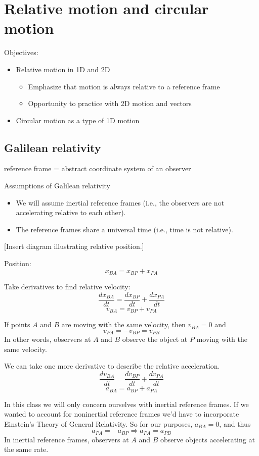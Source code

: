 \section{Relative motion and circular motion}
Objectives:
\begin{itemize}
\item Relative motion in 1D and 2D
  \begin{itemize}
  \item Emphasize that motion is always relative to a reference frame
  \item Opportunity to practice with 2D motion and vectors
  \end{itemize} 
\item Circular motion as a type of 1D motion
\end{itemize}
\hrulefill

\subsection{Galilean relativity}
reference frame = abstract coordinate system of an observer

Assumptions of Galilean relativity
\begin{itemize}
\item We will assume inertial reference frames (i.e., the observers are not accelerating relative to each other).
\item The reference frames share a universal time (i.e., time is not relative).
\end{itemize}
  
[Insert diagram illustrating relative position.]
\vspace{5cm}

Position:
$$\boxed{x_{BA}=x_{BP}+x_{PA}}$$

Take derivatives to find relative velocity:
$$\frac{dx_{BA}}{dt}=\frac{dx_{BP}}{dt}+\frac{dx_{PA}}{dt}$$
$$\boxed{v_{BA}=v_{BP}+v_{PA}}$$

If points $A$ and $B$ are moving with the same velocity, then $v_{BA}=0$ and
$$v_{PA}=-v_{BP}=v_{PB}$$
In other words, observers at $A$ and $B$ observe the object at $P$ moving with the same velocity.

We can take one more derivative to describe the relative acceleration.
$$\frac{dv_{BA}}{dt}=\frac{dv_{BP}}{dt}+\frac{dv_{PA}}{dt}$$
$$a_{BA}=a_{BP}+a_{PA}$$

In this class we will only concern ourselves with inertial reference frames. If we wanted to account for noninertial reference frames we'd have to incorporate Einstein's Theory of General Relativity. So for our purposes, $a_{BA}=0$, and thus
$$a_{PA}=-a_{BP}\Rightarrow \boxed{a_{PA}=a_{PB}}$$
In inertial reference frames, observers at $A$ and $B$ observe objects accelerating at the same rate.

